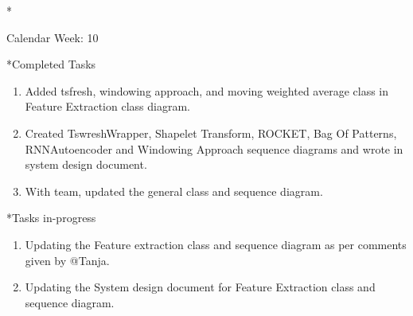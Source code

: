 \documentclass[11pt,a4paper]{article}
\begin{document}
\newpage
\begin{section}*{Calendar Week: 10 \hfill \date{12 March, 2021}}
 \begin{subsection}*{Completed Tasks}
     \begin{enumerate}
         \item Added tsfresh, windowing approach, and moving weighted average class in Feature Extraction class diagram.
         \item Created TswreshWrapper, Shapelet Transform, ROCKET, Bag Of Patterns, RNNAutoencoder and Windowing Approach sequence diagrams and wrote in system design document.
         \item With team, updated the general class and sequence diagram.
     \end{enumerate}
 \end{subsection}

 \begin{subsection}*{Tasks in-progress}
     \begin{enumerate}
         \item Updating the Feature extraction class and sequence diagram as per comments given by @Tanja.
         \item Updating the System design document for Feature Extraction class and sequence diagram.
     \end{enumerate}
 \end{subsection}
\end{section}
\end{document}
